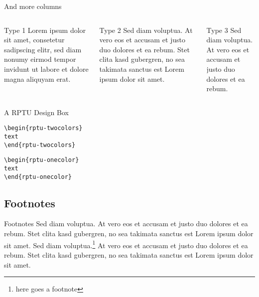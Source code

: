 \documentclass[]{beamer}
\begin{document}
\begin{frame}{And more columns}
\begin{columns}
\begin{column}{0.3\textwidth}
\begin{block}{Type 1}	
Lorem ipsum dolor sit amet, consetetur sadipscing elitr, sed diam nonumy eirmod tempor invidunt ut labore et dolore magna aliquyam erat.
\end{block}
\end{column}
\begin{column}{0.3\textwidth}
\begin{block}{Type 2}
Sed diam voluptua. At vero eos et accusam et justo duo dolores et ea rebum. Stet clita kasd gubergren, no sea takimata sanctus est Lorem ipsum dolor sit amet. 
\end{block}
\end{column}
\begin{column}{0.3\textwidth}
\begin{block}{Type 3}
Sed diam voluptua. At vero eos et accusam et justo duo dolores et ea rebum. 
\end{block}
\end{column}
\end{columns}
\end{frame}

\begin{frame}{A RPTU Design Box}
\begin{rptu-twocolors}
\texttt{\textbackslash begin\{rptu-twocolors\} \\ text \\ \textbackslash end\{rptu-twocolors\}}
\end{rptu-twocolors}
	
	\begin{rptu-onecolor}
		\texttt{\textbackslash begin\{rptu-onecolor\} \\ text \\ \textbackslash end\{rptu-onecolor\}}
	\end{rptu-onecolor}
\end{frame}

\subsection{Footnotes}

\begin{frame}{Footnotes}
	Sed diam voluptua. At vero eos et accusam et justo duo dolores et ea rebum. Stet clita kasd gubergren, no sea takimata sanctus est Lorem ipsum dolor sit amet. Sed diam voluptua.\footnote{here goes a footnote} At vero eos et accusam et justo duo dolores et ea rebum. Stet clita kasd gubergren, no sea takimata sanctus est Lorem ipsum dolor sit amet.
\end{frame}
\end{document}
